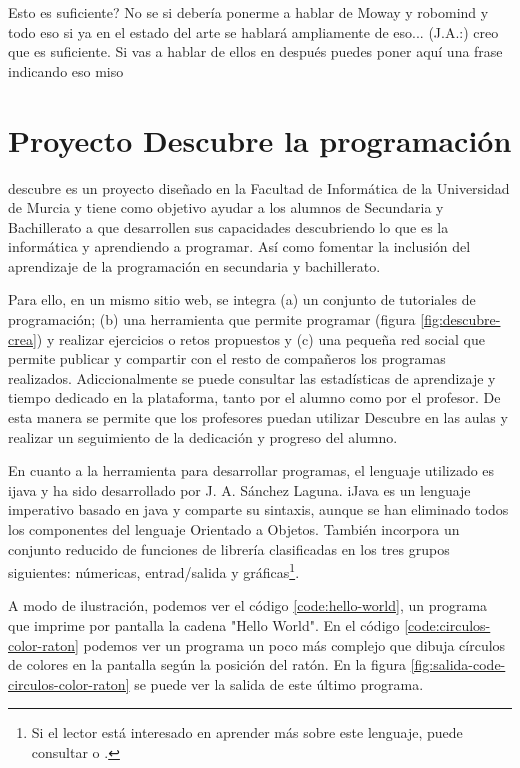 {\color{green}
Esto es suficiente?
No se si debería ponerme a hablar de Moway y robomind y todo eso si ya en el estado del arte se hablará ampliamente de eso...
(J.A.:) creo que es suficiente. Si vas a hablar de ellos en después puedes poner aquí una frase indicando eso miso
}



\section{Proyecto Descubre la programación}
\label{sec:descubre}

\Gls{descubre}\cite{descubre} es un proyecto diseñado en la Facultad de Informática de la Universidad de Murcia y tiene como objetivo ayudar a los alumnos de Secundaria y Bachillerato a que desarrollen sus capacidades descubriendo lo que es la informática y aprendiendo a programar. Así como fomentar la inclusión del aprendizaje de la programación en secundaria y bachillerato.

Para ello, en un mismo sitio web, se integra (a) un conjunto de tutoriales de programación; (b) una herramienta que permite programar (figura \ref{fig:descubre-crea}) y realizar ejercicios o retos propuestos y (c) una pequeña red social que permite publicar y compartir con el resto de compañeros los programas realizados. Adiccionalmente se puede consultar las estadísticas de aprendizaje y tiempo dedicado en la plataforma, tanto por el alumno como por el profesor. De esta manera se permite que los profesores puedan utilizar Descubre en las aulas y realizar un seguimiento de la dedicación y progreso del alumno.

En cuanto a la herramienta para desarrollar programas, el lenguaje utilizado es \gls{ijava}\cite{sanchez2009ijava} y ha sido desarrollado por J. A. Sánchez Laguna. iJava es un lenguaje imperativo basado en \Gls{java} y comparte su sintaxis, aunque se han eliminado todos los componentes del lenguaje Orientado a Objetos. También incorpora un conjunto reducido de funciones de librería clasificadas en los tres grupos siguientes: númericas, entrad/salida y gráficas\footnote{Si el lector está interesado en aprender más sobre este lenguaje, puede consultar \cite{sanchez2009ijava} o \cite{descubre-lenguaje}.}.

A modo de ilustración, podemos ver el código \ref{code:hello-world}, un programa que imprime por pantalla la cadena "Hello World". En el código \ref{code:circulos-color-raton} podemos ver un programa un poco más complejo que dibuja círculos de colores en la pantalla según la posición del ratón. En la figura \ref{fig:salida-code-circulos-color-raton} se puede ver la salida de este último programa.


